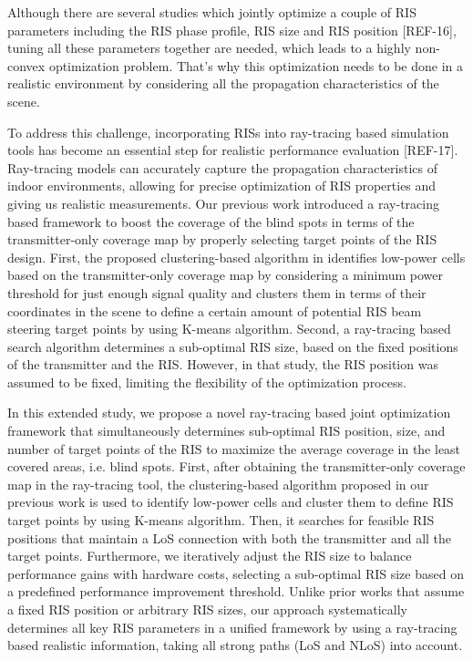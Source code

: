 \documentclass{IEEEoj}
\begin{document}
Although there are several studies which jointly optimize a couple of RIS parameters including the RIS phase profile, RIS size and RIS position [REF-16], tuning all these parameters together are needed, which leads to a highly non-convex optimization problem. That's why this optimization needs to be done in a realistic environment by considering all the propagation characteristics of the scene.

To address this challenge, incorporating RISs into ray-tracing based simulation tools has become an essential step for realistic performance evaluation [REF-17]. Ray-tracing models can accurately capture the propagation characteristics of indoor environments, allowing for precise optimization of RIS properties and giving us realistic measurements. Our previous work \cite{emre_claude_eucap_paper} introduced a ray-tracing based framework to boost the coverage of the blind spots in terms of the transmitter-only coverage map by properly selecting target points of the RIS design. First, the proposed clustering-based algorithm in \cite{emre_claude_eucap_paper} identifies low-power cells based on the transmitter-only coverage map by considering a minimum power threshold for just enough signal quality and clusters them in terms of their coordinates in the scene to define a certain amount of potential RIS beam steering target points by using K-means algorithm. Second, a ray-tracing based search algorithm determines a sub-optimal RIS size, based on the fixed positions of the transmitter and the RIS. However, in that study, the RIS position was assumed to be fixed, limiting the flexibility of the optimization process.

In this extended study, we propose a novel ray-tracing based joint optimization framework that simultaneously determines sub-optimal RIS position, size, and number of target points of the RIS to maximize the average coverage in the least covered areas, i.e. blind spots. First, after obtaining the transmitter-only coverage map in the ray-tracing tool, the clustering-based algorithm proposed in our previous work \cite{emre_claude_eucap_paper} is used to identify low-power cells and cluster them to define RIS target points by using K-means algorithm. Then, it searches for feasible RIS positions that maintain a LoS connection with both the transmitter and all the target points. Furthermore, we iteratively adjust the RIS size to balance performance gains with hardware costs, selecting a sub-optimal RIS size based on a predefined performance improvement threshold. Unlike prior works that assume a fixed RIS position or arbitrary RIS sizes, our approach systematically determines all key RIS parameters in a unified framework by using a ray-tracing based realistic information, taking all strong paths (LoS and NLoS) into account.
\end{document}
